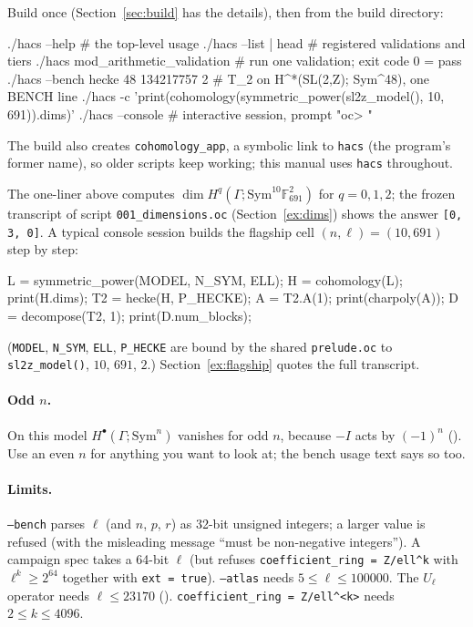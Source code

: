 \documentclass[11pt,openany]{report}
\newcommand{\F}{\mathbb{F}}
\newcommand{\Sym}{\mathrm{Sym}}
\newcommand{\cli}[1]{\texttt{#1}}
\newcommand{\file}[1]{\nolinkurl{#1}}
\newcommand{\vb}[1]{\texttt{#1}}
\newcommand{\excerptfrom}[1]{\par\smallskip\noindent{\small\textit{From} \nolinkurl{Console/scripts/#1}:}\par\nopagebreak}
\begin{document}
Build once (Section~\ref{sec:build} has the details), then from the build directory:

\begin{shell}
./hacs --help                     # the top-level usage
./hacs --list | head              # registered validations and tiers
./hacs mod_arithmetic_validation  # run one validation; exit code 0 = pass
./hacs --bench hecke 48 134217757 2      # T_2 on H^*(SL(2,Z); Sym^48), one BENCH line
./hacs -c 'print(cohomology(symmetric_power(sl2z_model(), 10, 691)).dims)'
./hacs --console                  # interactive session, prompt "oc> "
\end{shell}
The build also creates \texttt{cohomology\_app}, a symbolic link to \texttt{hacs} (the program's former name), so older
scripts keep working; this manual uses \texttt{hacs} throughout.

The one-liner above computes $\dim H^q(\Gamma;\Sym^{10}\F_{691}^2)$ for $q=0,1,2$; the frozen
transcript of script \file{001_dimensions.oc} (Section~\ref{ex:dims}) shows the answer \texttt{[0, 3, 0]}.
A typical console session builds the flagship cell $(n,\ell)=(10,691)$ step by step:

\excerptfrom{006_flagship.oc}
\begin{ocexcerpt}
L = symmetric_power(MODEL, N_SYM, ELL);
H = cohomology(L);
print(H.dims);
T2 = hecke(H, P_HECKE);
A = T2.A(1);
print(charpoly(A));
D = decompose(T2, 1);
print(D.num_blocks);
\end{ocexcerpt}

(\vb{MODEL}, \vb{N\_SYM}, \vb{ELL}, \vb{P\_HECKE} are bound by the shared \file{prelude.oc} to
\vb{sl2z\_model()}, $10$, $691$, $2$.) Section~\ref{ex:flagship} quotes the full transcript.

\paragraph{Odd $n$.} On this model $H^\bullet(\Gamma;\Sym^n)$ vanishes for odd $n$, because $-I$ acts by
$(-1)^n$ ({}). Use an even $n$ for anything you want to look at; the bench usage
text says so too.

\paragraph{Limits.} \cli{--bench} parses $\ell$ (and $n$, $p$, $r$) as 32-bit unsigned integers; a larger
value is refused (with the misleading message ``must be non-negative integers''). A campaign spec takes a
64-bit $\ell$ (but refuses \texttt{coefficient\_ring = Z/ell\^{}k} with $\ell^k\ge2^{64}$ together with
\texttt{ext = true}). \cli{--atlas} needs $5\le\ell\le100000$. The $U_\ell$ operator needs $\ell\le23170$
({}). \texttt{coefficient\_ring = Z/ell\^{}<k>} needs $2\le k\le4096$.
\end{document}
